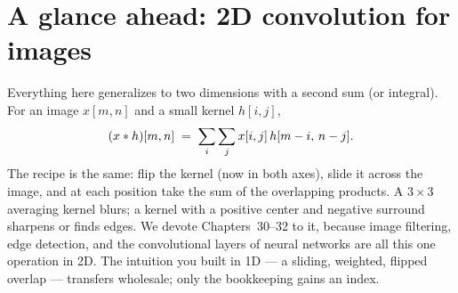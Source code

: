 \section{A glance ahead: 2D convolution for images}
\label{ch13:twod}

Everything here generalizes to two dimensions with a second sum (or integral).
For an image $x[m,n]$ and a small kernel $h[i,j]$,
\begin{equation}
\label{ch13:conv2d}
(x \ast h)[m,n] \;=\; \sum_{i}\sum_{j} x[i,j]\,h[m-i,\,n-j].
\end{equation}
The recipe is the same: flip the kernel (now in both axes), slide it across the
image, and at each position take the sum of the overlapping products. A
$3\times3$ averaging kernel blurs; a kernel with a positive center and negative
surround sharpens or finds edges. We devote Chapters~30--32 to it, because image
filtering, edge detection, and the convolutional layers of neural networks are
all this one operation in 2D. The intuition you built in 1D --- a sliding,
weighted, flipped overlap --- transfers wholesale; only the bookkeeping gains an
index.


